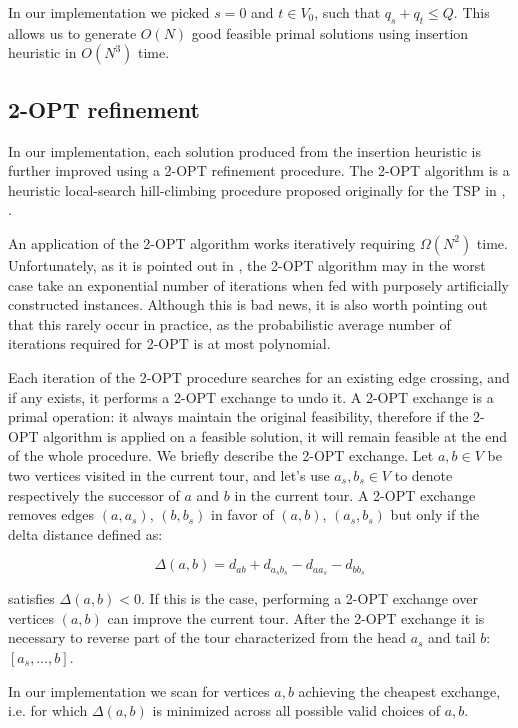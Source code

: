 In our implementation we picked $s = 0$ and $t \in V_0$, such that $q_s + q_t \le Q$.
This allows us to generate $O(N)$ good feasible primal solutions using insertion heuristic in $O(N^3)$ time.

\subsection{2-OPT refinement}
In our implementation, each solution produced from the insertion heuristic is further improved using a 2-OPT refinement procedure.
The 2-OPT algorithm is a heuristic local-search hill-climbing procedure proposed originally for the TSP in \cite{flood1956}, \cite{croes1958}.

An application of the 2-OPT algorithm works iteratively requiring $\Omega(N^2)$ time.
Unfortunately, as it is pointed out in \cite{chandra1999}, the 2-OPT algorithm may in the worst case take an exponential number of iterations when fed with purposely artificially constructed instances.
Although this is bad news, it is also worth pointing out that this rarely occur in practice, as the probabilistic average number of iterations required for 2-OPT is at most polynomial.

Each iteration of the 2-OPT procedure searches for an existing edge crossing, and if any exists, it performs a 2-OPT exchange to undo it.
A 2-OPT exchange is a primal operation: it always maintain the original feasibility, therefore if the 2-OPT algorithm is applied on a feasible solution, it will remain feasible at the end of the whole procedure.
We briefly describe the 2-OPT exchange.
Let $a, b \in V$ be two vertices visited in the current tour, and let's use $a_s, b_s \in V$ to denote respectively the successor of $a$ and $b$ in the current tour.
A 2-OPT exchange removes edges $(a, a_s)$, $(b, b_s)$ in favor of $(a, b)$, $(a_s, b_s)$ but only if the delta distance defined as:

\begin{equation}
	\Delta(a, b) = d_{ab} + d_{a_sb_s} - d_{aa_s} - d_{bb_s}
\end{equation}

satisfies $\Delta(a, b) < 0$.
If this is the case, performing a 2-OPT exchange over vertices $(a, b)$ can improve the current tour.
After the 2-OPT exchange it is necessary to reverse part of the tour characterized from the head $a_s$ and tail $b$: $[a_s, \dots, b]$.

In our implementation we scan for vertices $a, b$ achieving the cheapest exchange, i.e. for which $\Delta(a, b)$ is minimized across all possible valid choices of $a, b$.


